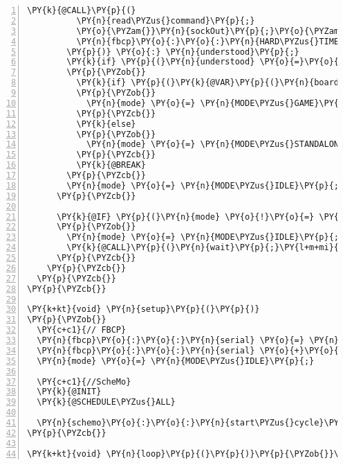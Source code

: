 \begin{Verbatim}[commandchars=\\\{\},numbers=left,firstnumber=1,stepnumber=1,frame=leftline,numbersep=0pt]
        \PY{k}{@CALL}\PY{p}{(}
          \PY{n}{read\PYZus{}command}\PY{p}{;}
          \PY{o}{\PYZam{}}\PY{n}{sockOut}\PY{p}{;}\PY{o}{\PYZam{}}\PY{k}{@VAR}\PY{p}{(}\PY{n}{cmd}\PY{p}{)}\PY{p}{;}
          \PY{n}{fbcp}\PY{o}{:}\PY{o}{:}\PY{n}{HARD\PYZus{}TIMEOUT}
        \PY{p}{)} \PY{o}{:} \PY{n}{understood}\PY{p}{;}
        \PY{k}{if} \PY{p}{(}\PY{n}{understood} \PY{o}{=}\PY{o}{=} \PY{n}{READ\PYZus{}SUCCESS} \PY{o}{\PYZam{}}\PY{o}{\PYZam{}} \PY{k}{@VAR}\PY{p}{(}\PY{n}{cmd}\PY{p}{)}\PY{p}{.}\PY{n}{command}\PY{o}{\PYZhy{}}\PY{o}{\PYZgt{}}\PY{n}{code} \PY{o}{=}\PY{o}{=} \PY{n}{fbcp}\PY{o}{:}\PY{o}{:}\PY{n}{A\PYZus{}GRANT\PYZus{}ACCESS}\PY{p}{.}\PY{n}{code}\PY{p}{)}
        \PY{p}{\PYZob{}}
          \PY{k}{if} \PY{p}{(}\PY{k}{@VAR}\PY{p}{(}\PY{n}{boardrobot}\PY{p}{)}\PY{p}{)}
          \PY{p}{\PYZob{}}
            \PY{n}{mode} \PY{o}{=} \PY{n}{MODE\PYZus{}GAME}\PY{p}{;}
          \PY{p}{\PYZcb{}}
          \PY{k}{else}
          \PY{p}{\PYZob{}}
            \PY{n}{mode} \PY{o}{=} \PY{n}{MODE\PYZus{}STANDALONE}\PY{p}{;}
          \PY{p}{\PYZcb{}}
          \PY{k}{@BREAK}
        \PY{p}{\PYZcb{}}
        \PY{n}{mode} \PY{o}{=} \PY{n}{MODE\PYZus{}IDLE}\PY{p}{;}
      \PY{p}{\PYZcb{}}

      \PY{k}{@IF} \PY{p}{(}\PY{n}{mode} \PY{o}{!}\PY{o}{=} \PY{n}{MODE\PYZus{}GAME} \PY{o}{\PYZam{}}\PY{o}{\PYZam{}} \PY{n}{mode} \PY{o}{!}\PY{o}{=} \PY{n}{MODE\PYZus{}STANDALONE}\PY{p}{)}
      \PY{p}{\PYZob{}}
        \PY{n}{mode} \PY{o}{=} \PY{n}{MODE\PYZus{}IDLE}\PY{p}{;}
        \PY{k}{@CALL}\PY{p}{(}\PY{n}{wait}\PY{p}{;}\PY{l+m+mi}{10000}\PY{p}{)}\PY{o}{:}\PY{n}{null}\PY{p}{;}
      \PY{p}{\PYZcb{}}
    \PY{p}{\PYZcb{}}
  \PY{p}{\PYZcb{}}
\PY{p}{\PYZcb{}}

\PY{k+kt}{void} \PY{n}{setup}\PY{p}{(}\PY{p}{)}
\PY{p}{\PYZob{}}  
  \PY{c+c1}{// FBCP}
  \PY{n}{fbcp}\PY{o}{:}\PY{o}{:}\PY{n}{serial} \PY{o}{=} \PY{n}{fbcp}\PY{o}{:}\PY{o}{:}\PY{n}{CONTR\PYZus{}PREFIX}\PY{p}{;}
  \PY{n}{fbcp}\PY{o}{:}\PY{o}{:}\PY{n}{serial} \PY{o}{+}\PY{o}{=} \PY{l+s}{\PYZdq{}}\PY{l+s}{00001}\PY{l+s}{\PYZdq{}}\PY{p}{;}
  \PY{n}{mode} \PY{o}{=} \PY{n}{MODE\PYZus{}IDLE}\PY{p}{;}
  
  \PY{c+c1}{//ScheMo}
  \PY{k}{@INIT}
  \PY{k}{@SCHEDULE\PYZus{}ALL}

  \PY{n}{schemo}\PY{o}{:}\PY{o}{:}\PY{n}{start\PYZus{}cycle}\PY{p}{(}\PY{p}{)}\PY{p}{;}
\PY{p}{\PYZcb{}}

\PY{k+kt}{void} \PY{n}{loop}\PY{p}{(}\PY{p}{)}\PY{p}{\PYZob{}}\PY{p}{\PYZcb{}}
\end{Verbatim}

